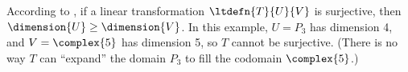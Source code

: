 According to , if a linear transformation $\ltdefn{T}{U}{V}$ is surjective, then $\dimension{U}\ge\dimension{V}$.  In this example, $U = P_3$ has dimension 4, and $V = \complex{5}$ has dimension 5, so $T$ cannot be surjective.  (There is no way $T$ can ``expand'' the domain $P_3$ to fill the codomain $\complex{5}$.)